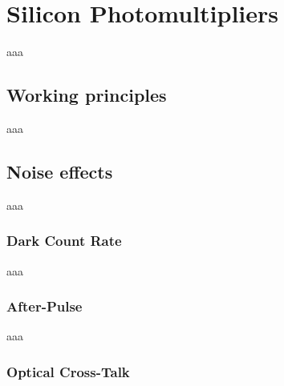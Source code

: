 \chapter{Silicon Photomultipliers}
aaa

\section{Working principles}
aaa

\section{Noise effects}
aaa

\subsection{Dark Count Rate}
aaa

\subsection{After-Pulse}
aaa

\subsection{Optical Cross-Talk}
